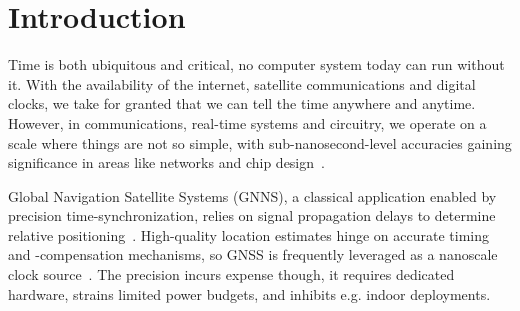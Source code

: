 
\section{Introduction}

Time is both ubiquitous and critical, no computer system today can run without it. With the availability of the internet, satellite communications and digital clocks, we take for granted that we can tell the time anywhere and anytime.
%
However, in communications, real-time systems and circuitry, we operate on a scale where things are not so simple, with sub-nanosecond-level accuracies gaining significance in areas like networks and chip design~\cite{nanopu,sub-nanosecond-comms-design}.

Global Navigation Satellite Systems (GNNS), a classical application enabled by precision time-synchronization, relies on signal propagation delays to determine relative positioning~\cite{intro-to-gnss}.
High-quality location estimates hinge on accurate timing and -compensation mechanisms, so GNSS is frequently leveraged as a nanoscale clock source~\cite{gnss-location-and-time-advances,gnss-for-high-precision-timing}.
The precision incurs expense though, it requires dedicated hardware, strains limited power budgets, and inhibits e.g. indoor deployments.


